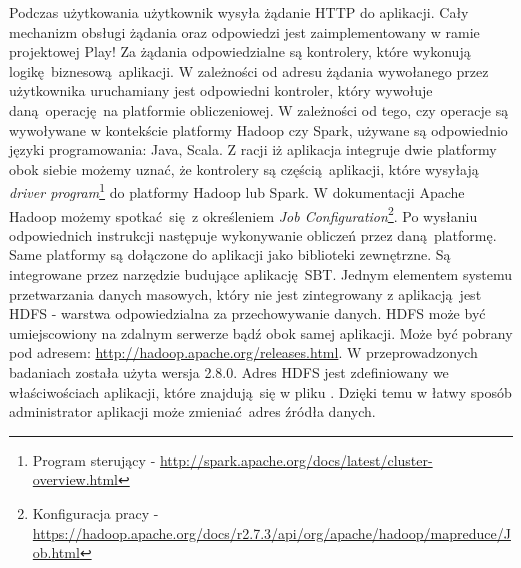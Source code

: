 \newline Podczas użytkowania użytkownik wysyła żądanie HTTP do aplikacji. Cały mechanizm obsługi żądania oraz odpowiedzi jest zaimplementowany w ramie projektowej Play! Za żądania odpowiedzialne są kontrolery, które wykonują logikę biznesową aplikacji. W zależności od adresu żądania wywołanego przez użytkownika uruchamiany jest odpowiedni kontroler, który wywołuje daną operację na platformie obliczeniowej. W zależności od tego, czy operacje są wywoływane w kontekście platformy Hadoop czy Spark, używane są odpowiednio języki programowania: Java, Scala. Z racji iż aplikacja integruje dwie platformy obok siebie możemy uznać, że kontrolery są częścią aplikacji, które wysyłają \textit{driver program}\footnote{Program sterujący - \url{http://spark.apache.org/docs/latest/cluster-overview.html}} do platformy Hadoop lub Spark. W dokumentacji Apache Hadoop możemy spotkać się z określeniem \textit{Job Configuration}\footnote{Konfiguracja pracy - \url{https://hadoop.apache.org/docs/r2.7.3/api/org/apache/hadoop/mapreduce/Job.html}}. Po wysłaniu odpowiednich instrukcji następuje wykonywanie obliczeń przez daną platformę. Same platformy są dołączone do aplikacji jako biblioteki zewnętrzne. Są integrowane przez narzędzie budujące aplikację SBT. Jednym elementem systemu przetwarzania danych masowych, który nie jest zintegrowany z aplikacją jest HDFS - warstwa odpowiedzialna za przechowywanie danych. HDFS może być umiejscowiony na zdalnym serwerze bądź obok samej aplikacji. Może być pobrany pod adresem: \url{http://hadoop.apache.org/releases.html}. W przeprowadzonych badaniach została użyta wersja 2.8.0. Adres HDFS jest zdefiniowany we właściwościach aplikacji, które znajdują się w pliku . Dzięki temu w łatwy sposób administrator aplikacji może zmieniać adres źródła danych.
